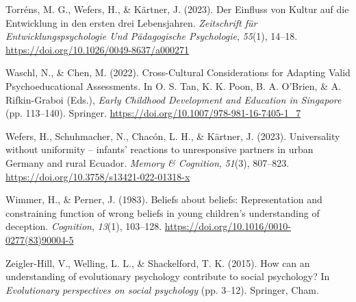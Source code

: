 \documentclass[
  man,floatsintext]{apa7}
\newlength{\cslhangindent}
\newenvironment{CSLReferences}[2] %
 {\begin{list}{}{%
  \setlength{\itemindent}{0pt}
  \setlength{\leftmargin}{0pt}
  \setlength{\parsep}{0pt}
  \ifodd #1
   \setlength{\leftmargin}{\cslhangindent}
   \setlength{\itemindent}{-1\cslhangindent}
  \fi
  \setlength{\itemsep}{#2\baselineskip}}}
 {\end{list}}
\begin{document}
\begin{CSLReferences}{1}{0}
Torréns, M. G., Wefers, H., \& Kärtner, J. (2023). Der {Einfluss} von {Kultur} auf die {Entwicklung} in den ersten drei {Lebensjahren}. \emph{Zeitschrift f{ü}r Entwicklungspsychologie Und P{ä}dagogische Psychologie}, \emph{55}(1), 14--18. \url{https://doi.org/10.1026/0049-8637/a000271}

Waschl, N., \& Chen, M. (2022). Cross-{Cultural Considerations} for {Adapting Valid Psychoeducational Assessments}. In O. S. Tan, K. K. Poon, B. A. O'Brien, \& A. Rifkin-Graboi (Eds.), \emph{Early {Childhood Development} and {Education} in {Singapore}} (pp. 113--140). Springer. \url{https://doi.org/10.1007/978-981-16-7405-1_7}

Wefers, H., Schuhmacher, N., Chacón, L. H., \& Kärtner, J. (2023). Universality without uniformity -- infants' reactions to unresponsive partners in urban {Germany} and rural {Ecuador}. \emph{Memory \& Cognition}, \emph{51}(3), 807--823. \url{https://doi.org/10.3758/s13421-022-01318-x}

Wimmer, H., \& Perner, J. (1983). Beliefs about beliefs: {Representation} and constraining function of wrong beliefs in young children's understanding of deception. \emph{Cognition}, \emph{13}(1), 103--128. \url{https://doi.org/10.1016/0010-0277(83)90004-5}

Zeigler-Hill, V., Welling, L. L., \& Shackelford, T. K. (2015). How can an understanding of evolutionary psychology contribute to social psychology? In \emph{Evolutionary perspectives on social psychology} (pp. 3--12). Springer, Cham.

\end{CSLReferences}

\endgroup
\end{document}
